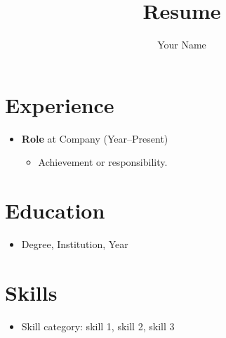 \documentclass[10pt,a4paper]{article}
\begin{document}
\title{Resume}
\author{Your Name}
\date{}
\maketitle

\section*{Experience}
\begin{itemize}
  \item \textbf{Role} at Company (Year--Present)
  \begin{itemize}
    \item Achievement or responsibility.
  \end{itemize}
\end{itemize}

\section*{Education}
\begin{itemize}
  \item Degree, Institution, Year
\end{itemize}

\section*{Skills}
\begin{itemize}
  \item Skill category: skill 1, skill 2, skill 3
\end{itemize}
\end{document}
